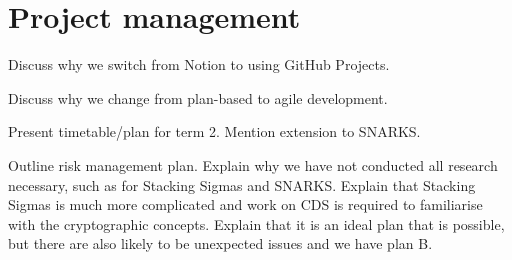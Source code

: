 \section{Project management}

Discuss why we switch from Notion to using GitHub Projects. 

Discuss why we change from plan-based to agile development. 

Present timetable/plan for term 2. Mention extension to SNARKS.

Outline risk management plan. Explain why we have not conducted all research necessary, such as for Stacking Sigmas and SNARKS. Explain that Stacking Sigmas is much more complicated and work on CDS is required to familiarise with the cryptographic concepts. Explain that it is an ideal plan that is possible, but there are also likely to be unexpected issues and we have plan B. 

